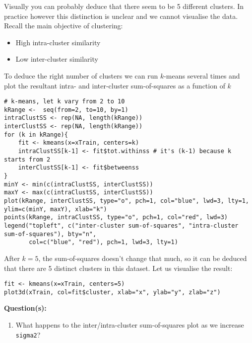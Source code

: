 \documentclass[a4paper,11pt]{article}
\begin{document}
Visually you can probably deduce that there seem to be 5 different clusters. In 
practice however this distinction is unclear and we cannot visualise the data.
Recall the main objective of clustering:

\begin{itemize}
	\item High intra-cluster similarity
	\item Low inter-cluster similarity
\end{itemize}

To deduce the right number of clusters we can run $k$-means several times and plot
the resultant intra- and inter-cluster sum-of-squares as a function of $k$
\\
\begin{lstlisting}[style=RCode]
# k-means, let k vary from 2 to 10
kRange <-  seq(from=2, to=10, by=1)
intraClustSS <- rep(NA, length(kRange))  
interClustSS <- rep(NA, length(kRange))
for (k in kRange){
    fit <- kmeans(x=xTrain, centers=k)
    intraClustSS[k-1] <- fit$tot.withinss # it's (k-1) because k starts from 2
    interClustSS[k-1] <- fit$betweenss
}
minY <- min(c(intraClustSS, interClustSS))
maxY <- max(c(intraClustSS, interClustSS))
plot(kRange, interClustSS, type="o", pch=1, col="blue", lwd=3, lty=1, ylim=c(minY, maxY), xlab="k")
points(kRange, intraClustSS, type="o", pch=1, col="red", lwd=3)
legend("topleft", c("inter-cluster sum-of-squares", "intra-cluster sum-of-squares"), bty="n",
       col=c("blue", "red"), pch=1, lwd=3, lty=1)
\end{lstlisting}

After $k=5$, the sum-of-squares doesn't change that much, so it can be deduced that
there are 5 distinct clusters in this dataset. Let us visualise the result:
\\
\begin{lstlisting}[style=RCode]
fit <- kmeans(x=xTrain, centers=5)
plot3d(xTrain, col=fit$cluster, xlab="x", ylab="y", zlab="z")
\end{lstlisting}

\begin{framed}
\textbf{Question(s):}
\begin{enumerate}
	\item What happens to the inter/intra-cluster sum-of-squares plot as we increase \texttt{sigma2}?
\end{enumerate}
\end{framed}
\end{document}
